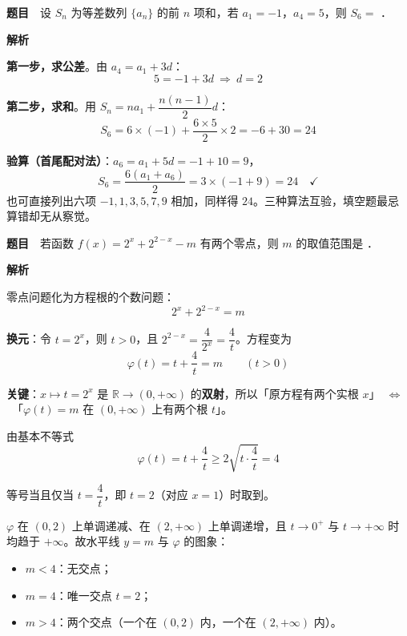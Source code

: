 

\textbf{题目}　设 $S_n$ 为等差数列 $\{a_n\}$ 的前 $n$ 项和，若 $a_1=-1$，$a_4=5$，则 $S_6=$ \gkblank{}．

\textbf{解析}

\textbf{第一步，求公差}。由 $a_4=a_1+3d$：
\[5=-1+3d\ \Longrightarrow\ d=2\]

\textbf{第二步，求和}。用 $S_n=na_1+\dfrac{n(n-1)}{2}d$：
\[S_6=6\times(-1)+\frac{6\times5}{2}\times2=-6+30=24\]


\begin{gktip}
\textbf{验算（首尾配对法）}：$a_6=a_1+5d=-1+10=9$，
\[S_6=\frac{6\left(a_1+a_6\right)}{2}=3\times(-1+9)=24\quad\checkmark\]
也可直接列出六项 $-1,1,3,5,7,9$ 相加，同样得 $24$。三种算法互验，填空题最忌算错却无从察觉。
\end{gktip}

\par\medskip


\textbf{题目}　若函数 $f(x)=2^x+2^{2-x}-m$ 有两个零点，则 $m$ 的取值范围是 \gkblank{}．

\textbf{解析}

零点问题化为方程根的个数问题：
\[2^x+2^{2-x}=m\]

\textbf{换元}：令 $t=2^x$，则 $t>0$，且 $2^{2-x}=\dfrac{4}{2^x}=\dfrac{4}{t}$。方程变为
\[\varphi(t)=t+\frac4t=m\qquad(t>0)\]

\textbf{关键}：$x\mapsto t=2^x$ 是 $\mathbb{R}\to(0,+\infty)$ 的\textbf{双射}，所以「原方程有两个实根 $x$」~$\Longleftrightarrow$~「$\varphi(t)=m$ 在 $(0,+\infty)$ 上有两个根 $t$」。

由基本不等式
\[\varphi(t)=t+\frac4t\ge2\sqrt{t\cdot\frac4t}=4\]

等号当且仅当 $t=\dfrac4t$，即 $t=2$（对应 $x=1$）时取到。

$\varphi$ 在 $(0,2)$ 上单调递减、在 $(2,+\infty)$ 上单调递增，且 $t\to0^+$ 与 $t\to+\infty$ 时均趋于 $+\infty$。故水平线 $y=m$ 与 $\varphi$ 的图象：
\begin{itemize}
\item $m<4$：无交点；
\item $m=4$：唯一交点 $t=2$；
\item $m>4$：两个交点（一个在 $(0,2)$ 内，一个在 $(2,+\infty)$ 内）。
\end{itemize}

